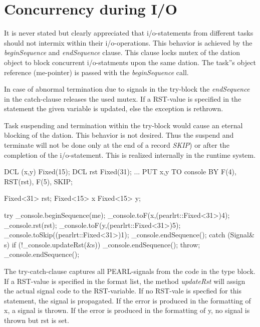 \section{Concurrency during I/O}
\label{ioconcurrency}
It is never stated but clearly appreciated that i/o-statements from
different tasks should not intermix within their i/o-operations.
This behavior is achieved by the {\em beginSequence} and 
{\em endSequence} clause. 
This clause locks mutex of the dation object to block concurrent
i/o-statments upon the same dation.
The task''s object reference (me-pointer) is passed with
the {\em beginSequence} call.

In case of abnormal termination due to signals in the try-block
the {\em endSequence} in the catch-clause releases the used mutex.
If a RST-value is specified in the statement the given variable is
updated, else the exception is rethrown.

Task suspending and termination within the try-block would cause an
eternal blocking of the dation. 
This behavior is not desired.
Thus the suspend and terminate will not be done only at the end of a record
{\em SKIP}) or after the completion of the i/o-statement.
This is realized internally in the runtime system.

\begin{PEARLCode}
DCL (x,y) Fixed(15);
DCL rst Fixed(31);
...
PUT x,y TO console BY F(4), RST(rst), F(5), SKIP;
\end{PEARLCode}

\begin{CppCode}
Fixed<31> rst;
Fixed<15> x
Fixed<15> y;

try {
   _console.beginSequence(me);
   _console.toF(x,(pearlrt::Fixed<31>)4);
   _console.rst(rst);
   _console.toF(y,(pearlrt::Fixed<31>)5);
   _console.toSkip((pearlrt::Fixed<31>)1);
   _console.endSequence();
} catch (Signal& s) {
   if (!_console.updateRst(&s)) {
      _console.endSequence();
      throw;
   }
   _console.endSequence();
}
\end{CppCode}

The try-catch-clause captures all PEARL-signals from the code in the 
type block. If a RST-value is specified in the format list, the method
{\em updateRst} will assign the actual signal code to the RST-variable.
If no RST-vale is specfied for this statement, the signal is propagated.
If the error is produced in the formatting of x, a signal is thrown.
If the error is produced in the formatting of y, no signal is thrown but rst
is set.

